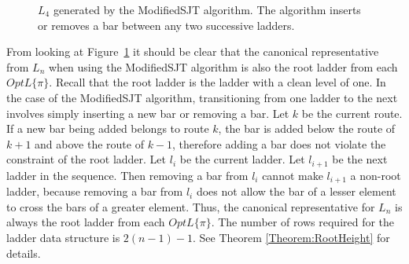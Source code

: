 \begin{center}
\begin{figure}[!htp]
  \caption{$L_{4}$ generated by the {\sc ModifiedSJT} algorithm. The algorithm inserts or removes a bar between any two successive ladders.}
  \label{Fig:CanLSJT}
\end{figure}
\end{center}
\pagebreak



From looking at Figure~\ref{Fig:CanLSJT} it should be clear that the canonical representative from $L_{n}$ when using the 
{\sc ModifiedSJT} algorithm is also the root ladder from each $OptL\{\pi\}$. Recall that the root ladder is the 
ladder with a clean level of one. In the case of the 
{\sc ModifiedSJT} algorithm, transitioning from one ladder to the next involves simply inserting a new bar 
or removing a bar. Let $k$ be the current route. If a new bar being added belongs to 
route $k$, the bar is added below the route of $k+1$ and above the route of $k-1$, therefore 
adding a bar does not violate the constraint of the root ladder. Let $l_{i}$ be the current ladder.
Let $l_{i+1}$ be the next ladder in the sequence. 
Then removing a bar from $l_{i}$ cannot make $l_{i+1}$ a non-root ladder, because 
removing a bar from $l_{i}$ does not allow the bar of a lesser element to cross the bars of a greater element.
Thus, the canonical representative for $L_{n}$ is always the root ladder from each $OptL\{\pi\}$. The number of 
rows required for the ladder data structure is $2(n-1)-1$. See Theorem \ref{Theorem:RootHeight} for details.\par 



